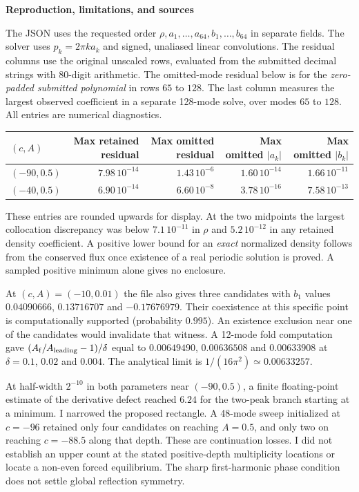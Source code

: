 \documentclass[11pt]{article}
\newcommand{\titleline}[1]{{\Large\bfseries\sffamily\color{ink}#1}\par}
\newcommand{\topic}[1]{\smallskip{\bfseries\sffamily\color{accent}#1}\par\nobreak}
\begin{document}
\newpage
\titleline{Reproduction, limitations, and sources}
\topic{Numerical evidence}
The JSON uses the requested order $\rho,a_1,\ldots,a_{64},b_1,\ldots,b_{64}$ in separate fields. The solver uses $p_k=2\pi k a_k$ and signed, unaliased linear convolutions. The residual columns use the original unscaled rows, evaluated from the submitted decimal strings with 80-digit arithmetic. The omitted-mode residual below is for the \emph{zero-padded submitted polynomial} in rows $65$ to $128$. The last column measures the largest observed coefficient in a separate 128-mode solve, over modes $65$ to $128$. All entries are numerical diagnostics.
\begin{center}\small
\begin{tabular}{@{}lrrrr@{}}\toprule
$(c,A)$ & Max retained residual & Max omitted residual & Max omitted $|a_k|$ & Max omitted $|b_k|$\\\midrule
$(-90,0.5)$ & $7.98\,10^{-14}$ & $1.43\,10^{-6}$ & $1.60\,10^{-14}$ & $1.66\,10^{-11}$\\
$(-40,0.5)$ & $6.90\,10^{-14}$ & $6.60\,10^{-8}$ & $3.78\,10^{-16}$ & $7.58\,10^{-13}$\\\bottomrule
\end{tabular}\end{center}
These entries are rounded upwards for display. At the two midpoints the largest collocation discrepancy was below $7.1\,10^{-11}$ in $\rho$ and $5.2\,10^{-12}$ in any retained density coefficient. A positive lower bound for an \emph{exact} normalized density follows from the conserved flux once existence of a real periodic solution is proved. A sampled positive minimum alone gives no enclosure.

At $(c,A)=(-10,0.01)$ the file also gives three candidates with $b_1$ values $0.04090666$, $0.13716707$ and $-0.17676979$. Their coexistence at this specific point is computationally supported (probability $0.995$). An existence exclusion near one of the candidates would invalidate that witness. A 12-mode fold computation gave $(A_{\rm f}/A_{\rm leading}-1)/\delta$ equal to $0.00649490$, $0.00636508$ and $0.00633908$ at $\delta=0.1$, $0.02$ and $0.004$. The analytical limit is $1/(16\pi^2)\simeq0.00633257$.

\topic{Negative results}
At half-width $2^{-10}$ in both parameters near $(-90,0.5)$, a finite floating-point estimate of the derivative defect reached $6.24$ for the two-peak branch starting at a minimum. I narrowed the proposed rectangle. A 48-mode sweep initialized at $c=-96$ retained only four candidates on reaching $A=0.5$, and only two on reaching $c=-88.5$ along that depth. These are continuation losses. I did not establish an upper count at the stated positive-depth multiplicity locations or locate a non-even forced equilibrium. The sharp first-harmonic phase condition does not settle global reflection symmetry.
\end{document}
